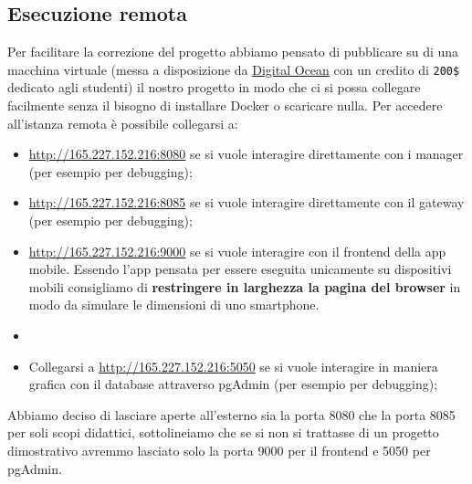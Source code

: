 \subsection{Esecuzione remota}
Per facilitare la correzione del progetto abbiamo pensato di pubblicare su di una macchina virtuale (messa a disposizione da \href{https://www.digitalocean.com}{Digital Ocean} con un credito di \verb|200$| dedicato agli studenti) il nostro progetto in modo che ci si possa collegare facilmente senza il bisogno di installare Docker o scaricare nulla. Per accedere all'istanza remota è possibile collegarsi a:
\begin{itemize}
  \item \href{http://165.227.152.216:8080}{http://165.227.152.216:8080} se si vuole interagire direttamente con i manager (per esempio per debugging);
  \item \href{http://165.227.152.216:8085}{http://165.227.152.216:8085} se si vuole interagire direttamente con il gateway (per esempio per debugging);
  \item \href{http://165.227.152.216:9000}{http://165.227.152.216:9000} se si vuole interagire con il frontend della app mobile. Essendo l'app pensata per essere eseguita unicamente su dispositivi mobili consigliamo di \textbf{restringere in larghezza la pagina del browser} in modo da simulare le dimensioni di uno smartphone.
  \item     
  \item Collegarsi a \href{http://165.227.152.216:5050}{http://165.227.152.216:5050} se si vuole interagire in maniera grafica con il database attraverso pgAdmin (per esempio per debugging);
\end{itemize}
Abbiamo deciso di lasciare aperte all'esterno sia la porta 8080 che la porta 8085 per soli scopi didattici, sottolineiamo che se si non si trattasse di un progetto dimostrativo avremmo lasciato solo la porta 9000 per il frontend e 5050 per pgAdmin.



